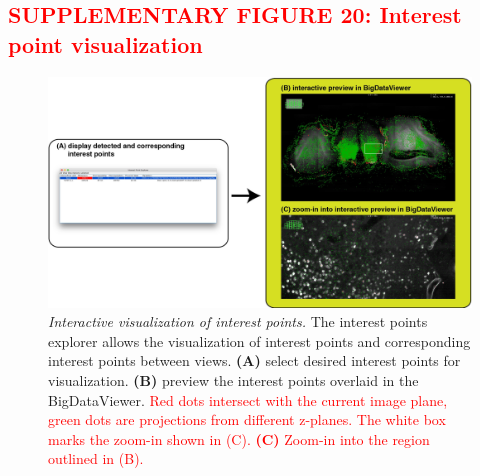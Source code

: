 \documentclass[]{spie}  %
\def\red{\textcolor{red}}
\begin{document}
\subsection*{\red{SUPPLEMENTARY FIGURE 20: Interest point visualization}}
\vspace{1mm}
\begin{figure}[h!]
\includegraphics[width=\textwidth]{Supp-IntrestPoints.jpg}
\vspace{-2.0mm}
\caption{\hspace{-0.5mm} \emph{Interactive visualization of interest points.} The interest points explorer allows the visualization of interest points and corresponding interest points between views. \textbf{(A)} select desired interest points for visualization. \textbf{(B)} preview the interest points overlaid in the BigDataViewer. \red{Red dots intersect with the current image plane, green dots are projections from different z-planes. The white box marks the zoom-in shown in (C). \textbf{(C)} Zoom-in into the region outlined in (B).}
}
\label{fig:sup-fig-interest-point}
\end{figure}

\pagebreak
\end{document}
